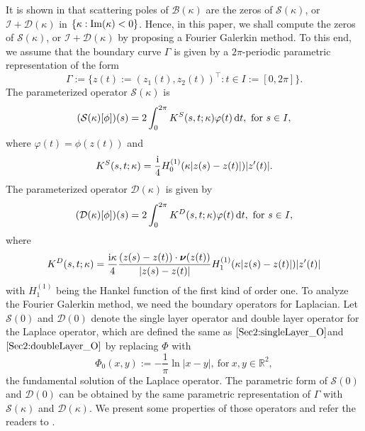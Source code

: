 \documentclass{article}
\renewcommand{\vec}[1]{\boldsymbol{#1}}
\newcommand{\abs}[1]{\left\vert#1\right\vert}
\newcommand{\set}[1]{\left\{#1\right\}}
\renewcommand{\vec}[1]{\boldsymbol{#1}}
\begin{document}
	It is shown in \cite{Taylor1996} that scattering poles of $\mathcal{B}(\kappa)$ are the zeros of $\mathcal{S}(\kappa)$, or $\mathcal{I}+\mathcal{D}(\kappa)$ in  $\set{\kappa:\rm{Im}(\kappa)<0}$. Hence, in this paper, we shall compute the zeros of $\mathcal{S}(\kappa)$, or $\mathcal{I}+\mathcal{D}(\kappa)$ by proposing a Fourier Galerkin method. To this end, we assume that the boundary curve $\Gamma$ is given by a $2\pi$-periodic parametric representation of the form
	\begin{equation*}
		\Gamma:=\{z(t):=(z_1(t),z_2(t))^\top: t\in I:=[0,2\pi]\}.
	\end{equation*}  
	The parameterized operator $\mathcal{S}(\kappa)$ is
	\begin{equation}\label{Sec2:singleLayer_O}
		(\mathcal{S}(\kappa)[\phi])(s)=2\int_0^{2\pi}K^S(s,t;\kappa)\varphi(t)\,{\rm d}t,~\text{for}~s\in I,
	\end{equation}
	where $\varphi(t)=\phi(z(t))$ and
	\begin{equation*}
		K^S(s, t;\kappa)=\dfrac{\rm i}{4}H_0^{(1)}(\kappa|z(s)-z(t)|)|z'(t)|.
	\end{equation*}
	The parameterized operator $\mathcal{D}(\kappa)$ is given by
	\begin{equation}\label{Sec2:doubleLayer_O}
		(\mathcal{D}(\kappa)[\phi])(s)=2\int_0^{2\pi}K^D(s,t;\kappa)\varphi(t)\,{\rm d}t,~\text{for}~s\in I,
	\end{equation}
	where
	\begin{equation*}
		K^D(s, t;\kappa)=\dfrac{\rm i\kappa}{4}\dfrac{(z(s)-z(t))\cdot\vec{\nu}(z(t))}{|z(s)-z(t)|}H_1^{(1)}(\kappa|z(s)-z(t)|)|z'(t)|
	\end{equation*}
	with ${ H}_1^{(1)}$ being the Hankel function of the first kind of order one. To analyze the Fourier Galerkin method, we need the boundary operators for Laplacian. Let $\mathcal{S}(0)$ and $\mathcal{D}(0)$ denote the single layer operator and  double layer operator for the Laplace operator, which are defined the same as $\eqref{Sec2:singleLayer_O}$and $\eqref{Sec2:doubleLayer_O}$ by replacing $\Phi$ with 
	\begin{equation*}
		\Phi_0(x,y):=-\dfrac{1}{\pi}\ln{\abs{x-y}},~\text{for}~x,y\in\mathbb{R}^2,
	\end{equation*}
	the fundamental solution of the Laplace operator. The parametric form of $\mathcal{S}(0)$ and $\mathcal{D}(0)$ can be obtained by the same parametric representation of $\Gamma$ with $\mathcal{S}(\kappa)$ and $\mathcal{D}(\kappa)$. We present some properties of those operators and refer the readers to \cite{Anne2011,DominguezLyonTurc2016,Kirsch1989,Taylor1996}. 
	
\end{document}
